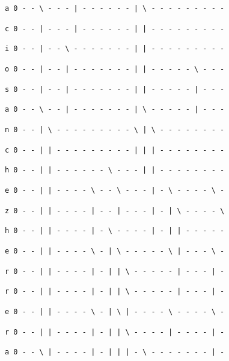 \documentclass[11pt,a4paper]{article} %
\begin{document}
\texttt{a 0 - - \textbackslash{ }- - - | - - - - - - | \textbackslash{ }- - - - - - - - -}

\texttt{c 0 - - | - - - | - - - - - - | | - - - - - - - - -}

\texttt{i 0 - - | - - \textbackslash{ }- - - - - - - | | - - - - - - - - -}

\texttt{o 0 - - | - - | - - - - - - - | | - - - - - \textbackslash{ }- - -}

\texttt{s 0 - - | - - | - - - - - - - | | - - - - - | - - -}

\texttt{a 0 - - \textbackslash{ }- - | - - - - - - - | \textbackslash{ }- - - - - | - - -}

\texttt{n 0 - - | \textbackslash{ }- - - - - - - - - \textbackslash{ }| \textbackslash{ }- - - - - - - -}

\texttt{c 0 - - | | - - - - - - - - - | | | - - - - - - - -}

\texttt{h 0 - - | | - - - - - - \textbackslash{ }- - - | | - - - - - - - -}

\texttt{e 0 - - | | - - - - \textbackslash{ }- - \textbackslash{ }- - - | - \textbackslash{ }- - - - \textbackslash{ }-} 

\texttt{z 0 - - | | - - - - | - - | - - - | - | \textbackslash{ }- - - - \textbackslash{ }}

\texttt{h 0 - - | | - - - - | - \textbackslash{ }- - - - | - | | - - - - -}

\texttt{e 0 - - | | - - - - \textbackslash{ }- | \textbackslash{ }- - - - - \textbackslash{ }| - - - \textbackslash{ }-}

\texttt{r 0 - - | | - - - - | - | | \textbackslash{ }- - - - - | - - - | -}

\texttt{r 0 - - | | - - - - | - | | \textbackslash{ }- - - - - | - - - | -}

\texttt{e 0 - - | | - - - - \textbackslash{ }- | \textbackslash{ }| - - - - \textbackslash{ }- - - - \textbackslash{ }-}

\texttt{r 0 - - | | - - - - | - | | \textbackslash{ }- - - - | - - - - | -}

\texttt{a 0 - - \textbackslash{ }| - - - - | - | | | - \textbackslash{ }- - - - - - - | -}



\normalsize



\end{document}
